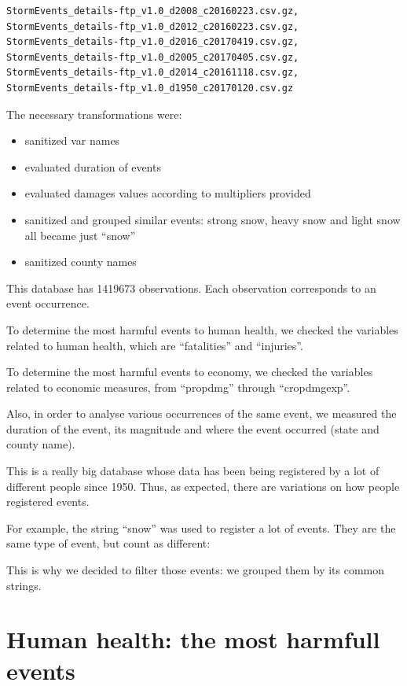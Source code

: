 \documentclass[]{article}
\providecommand{\tightlist}{%
  \setlength{\itemsep}{0pt}\setlength{\parskip}{0pt}}
\begin{document}
\begin{verbatim}
StormEvents_details-ftp_v1.0_d2008_c20160223.csv.gz, StormEvents_details-ftp_v1.0_d2012_c20160223.csv.gz, StormEvents_details-ftp_v1.0_d2016_c20170419.csv.gz, StormEvents_details-ftp_v1.0_d2005_c20170405.csv.gz, StormEvents_details-ftp_v1.0_d2014_c20161118.csv.gz, StormEvents_details-ftp_v1.0_d1950_c20170120.csv.gz
\end{verbatim}

The necessary transformations were:

\begin{itemize}
\tightlist
\item
  sanitized var names
\item
  evaluated duration of events
\item
  evaluated damages values according to multipliers provided
\item
  sanitized and grouped similar events: strong snow, heavy snow and
  light snow all became just ``snow''
\item
  sanitized county names
\end{itemize}

This database has 1419673 observations. Each observation corresponds to
an event occurrence.

To determine the most harmful events to human health, we checked the
variables related to human health, which are ``fatalities'' and
``injuries''.

To determine the most harmful events to economy, we checked the
variables related to economic measures, from ``propdmg'' through
``cropdmgexp''.

Also, in order to analyse various occurrences of the same event, we
measured the duration of the event, its magnitude and where the event
occurred (state and county name).

This is a really big database whose data has been being registered by a
lot of different people since 1950. Thus, as expected, there are
variations on how people registered events.

For example, the string ``snow'' was used to register a lot of events.
They are the same type of event, but count as different:

This is why we decided to filter those events: we grouped them by its
common strings.

\section{Human health: the most harmfull
events}\label{human-health-the-most-harmfull-events}
\end{document}

